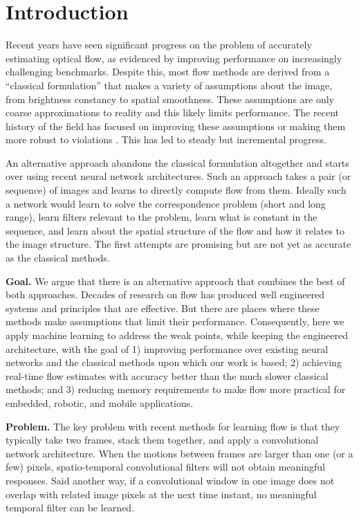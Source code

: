 \documentclass[10pt,twocolumn,letterpaper]{article}
\newcommand\myworries[1]{\textcolor{red}{#1}}
\begin{document}
\section{Introduction}
Recent years have seen significant progress on the problem of accurately estimating optical flow, as evidenced by improving performance on increasingly challenging benchmarks.
Despite this, most flow methods are derived from a ``classical formulation'' that makes a variety of assumptions about the image, from brightness constancy to spatial smoothness.
These assumptions are only coarse approximations to reality and this likely limits performance.
The recent history of the field has focused on improving these assumptions or making them more robust to violations \cite{black1993framework}.
This has led to steady but incremental progress.

An alternative approach abandons the classical formulation altogether and starts over using recent neural network architectures.  
Such an approach takes a pair (or sequence) of images and learns to directly compute flow from them.
Ideally such a network would learn to solve the correspondence problem (short and long range), learn filters relevant to the problem, learn what is constant in the sequence, and learn about the spatial structure of the flow and how it relates to the image structure.
The first attempts are promising but are not yet as accurate as the classical methods.%

{\bf Goal.}
We argue that there is an alternative approach that combines the best of both approaches.
Decades of research on flow has produced well engineered systems and principles that are effective.
But there are places where these methods make assumptions that limit their performance.
Consequently, here we apply machine learning to address the weak points, while keeping the engineered architecture, with the goal of 1) improving performance over existing neural networks and the classical methods upon which our work is based;
2) achieving real-time flow estimates with accuracy better than the much slower classical methods; and 3) reducing memory requirements to make flow more practical for embedded, robotic, and mobile applications.

{\bf Problem.} 
The key problem with recent methods for learning flow \cite{dosovitskiy2015flownet} 
is that they typically take two frames, stack them together, and apply a convolutional network architecture.
When the motions between frames are larger than one (or a few) pixels, spatio-temporal convolutional filters will not obtain meaningful responses.
Said another way, if a convolutional window in one image does not overlap with related image pixels at the next time instant, no meaningful temporal filter can be learned.
\end{document}
